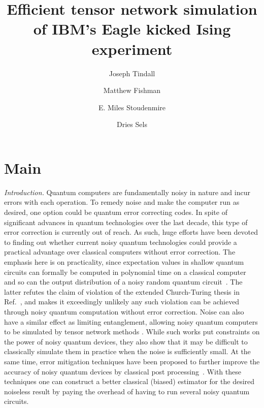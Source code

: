 \documentclass[%
 superscriptaddress,
 amsmath,amssymb,
 prx, nofootinbib,
]{revtex4-2}
\begin{document}
\title{Efficient tensor network simulation of IBM's Eagle kicked Ising experiment}


\author{Joseph Tindall}

\author{Matthew Fishman}

\author{E. Miles Stoudenmire}

\author{Dries Sels}



\maketitle


\section*{Main}

\emph{Introduction.} Quantum computers are fundamentally noisy in nature and incur errors with each operation. To remedy noise and make the computer run as desired, one option could be quantum error correcting codes. In spite of significant advances in quantum technologies over the last decade, this type of error correction is currently out of reach. As such, huge efforts have been devoted to finding out whether current noisy quantum technologies could provide a practical advantage over classical computers without error correction. The emphasis here is on practicality, since expectation values in shallow quantum circuits can formally be computed in polynomial time on a classical computer~\cite{bravyi21,wild23} and so can the output distribution of a noisy random quantum circuit~\cite{aharonov23}. The latter refutes the claim of violation of the extended Church-Turing thesis in Ref.~\cite{arute19}, and makes it exceedingly unlikely any such violation can be achieved through noisy quantum computation without error correction. 
Noise can also have a similar effect as limiting entanglement, allowing noisy quantum computers to be simulated by
 tensor network methods \cite{Zhou2020, Pan2022, Ayral2023}.
While such works put constraints on the power of noisy quantum devices, they also show that it may be difficult to classically simulate them in practice when the noise is sufficiently small. At the same time, error mitigation techniques have been proposed to further improve the accuracy of noisy quantum devices by classical post processing~\cite{temme17,vandenberg23}. With these techniques one can construct a better classical (biased) estimator for the desired noiseless result by paying the overhead of having to run several noisy quantum circuits.
\end{document}
